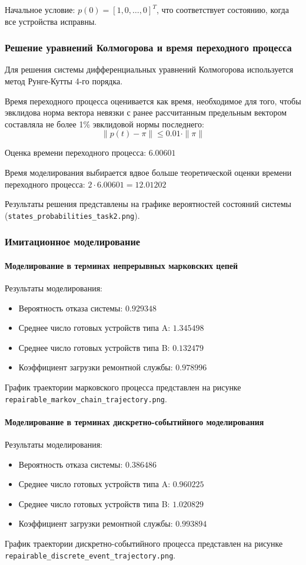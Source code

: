 Начальное условие: $p(0) = [1, 0, \ldots, 0]^T$, что соответствует состоянию, когда все устройства исправны.

\subsubsection{Решение уравнений Колмогорова и время переходного процесса}

Для решения системы дифференциальных уравнений Колмогорова используется метод Рунге-Кутты 4-го порядка. 

Время переходного процесса оценивается как время, необходимое для того, чтобы эвклидова норма вектора невязки с ранее рассчитанным предельным вектором составляла не более 1\% эвклидовой нормы последнего:
\begin{equation}
\|p(t) - \pi\| \leq 0.01 \cdot \|\pi\|
\end{equation}

Оценка времени переходного процесса: $6.00601$

Время моделирования выбирается вдвое больше теоретической оценки времени переходного процесса: $2 \cdot 6.00601 = 12.01202$

Результаты решения представлены на графике вероятностей состояний системы (\texttt{states\_probabilities\_task2.png}).

\subsubsection{Имитационное моделирование}

\paragraph{Моделирование в терминах непрерывных марковских цепей}
Результаты моделирования:
\begin{itemize}
    \item Вероятность отказа системы: $0.929348$
    \item Среднее число готовых устройств типа A: $1.345498$
    \item Среднее число готовых устройств типа B: $0.132479$
    \item Коэффициент загрузки ремонтной службы: $0.978996$
\end{itemize}

График траектории марковского процесса представлен на рисунке \texttt{repairable\_markov\_chain\_trajectory.png}.

\paragraph{Моделирование в терминах дискретно-событийного моделирования}
Результаты моделирования:
\begin{itemize}
    \item Вероятность отказа системы: $0.386486$
    \item Среднее число готовых устройств типа A: $0.960225$
    \item Среднее число готовых устройств типа B: $1.020829$
    \item Коэффициент загрузки ремонтной службы: $0.993894$
\end{itemize}

График траектории дискретно-событийного процесса представлен на рисунке \texttt{repairable\_discrete\_event\_trajectory.png}.

\newpage
